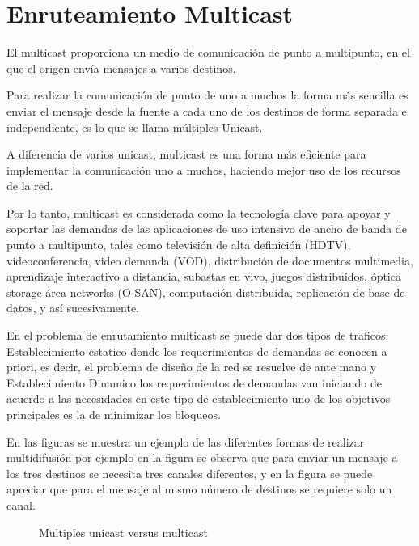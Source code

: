 
\section{Enruteamiento Multicast}

El multicast proporciona un medio de comunicación de punto a multipunto,
en el que el origen envía mensajes a varios destinos.

Para realizar la comunicación de punto de uno a muchos la forma más
sencilla es enviar el mensaje desde la fuente a cada uno de los destinos
de forma separada e independiente, es lo que se llama múltiples Unicast.

A diferencia de varios unicast, multicast es una forma más eficiente
para implementar la comunicación uno a muchos, haciendo mejor uso
de los recursos de la red.

Por lo tanto, multicast es considerada como la tecnología clave para
apoyar y soportar las demandas de las aplicaciones de uso intensivo
de ancho de banda de punto a multipunto, tales como televisión de
alta definición (HDTV), videoconferencia, video demanda (VOD), distribución
de documentos multimedia, aprendizaje interactivo a distancia, subastas
en vivo, juegos distribuidos, óptica storage área networks (O-SAN),
computación distribuida, replicación de base de datos, y así sucesivamente\cite{zhou2005optical}.

En el problema de enrutamiento multicast se puede dar dos tipos de
traficos: Establecimiento estatico donde los requerimientos de demandas
se conocen a priori, es decir, el problema de diseño de la red se
resuelve de ante mano y Establecimiento Dinamico los requerimientos
de demandas van iniciando de acuerdo a las necesidades en este tipo
de establecimiento uno de los objetivos principales es la de minimizar
los bloqueos.

En las figuras  se muestra
un ejemplo de las diferentes formas de realizar multidifusión por
ejemplo en la figura  se observa
que para enviar un mensaje a los tres destinos se necesita tres canales
diferentes, y en la figura  se puede apreciar
que para el mensaje al mismo número de destinos se requiere solo un
canal.

\begin{figure}[H]
\caption{Multiples unicast versus multicast \foreignlanguage{english}{\label{fig:Multiples-unicast-versus}}}
\end{figure}


